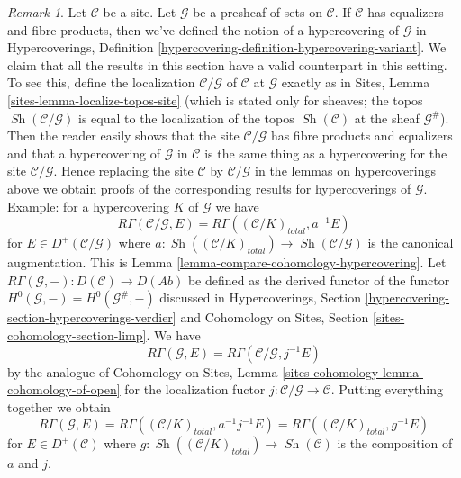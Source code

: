 \documentclass{stacks-project}
\theoremstyle{plain}
\theoremstyle{definition}
\theoremstyle{remark}
\newtheorem{remark}[subsection]{Remark}
\numberwithin{equation}{subsection}
\def\Sh{\mathop{\mathit{Sh}}\nolimits}
\begin{document}
\begin{remark}
\label{remark-compare-cohomology-hypercovering-presheaf}
Let $\mathcal{C}$ be a site. Let $\mathcal{G}$ be a presheaf of sets on
$\mathcal{C}$. If $\mathcal{C}$ has equalizers and fibre products, then
we've defined the notion of a hypercovering of $\mathcal{G}$ in
Hypercoverings, Definition \ref{hypercovering-definition-hypercovering-variant}.
We claim that all the results in this section have a
valid counterpart in this setting.
To see this,
define the localization $\mathcal{C}/\mathcal{G}$
of $\mathcal{C}$ at $\mathcal{G}$ exactly as in
Sites, Lemma \ref{sites-lemma-localize-topos-site}
(which is stated only for sheaves; the topos
$\Sh(\mathcal{C}/\mathcal{G})$ is equal to the localization
of the topos $\Sh(\mathcal{C})$ at the sheaf $\mathcal{G}^\#$).
Then the reader easily shows that the site
$\mathcal{C}/\mathcal{G}$ has fibre products and equalizers
and that a hypercovering of $\mathcal{G}$ in $\mathcal{C}$
is the same thing as a hypercovering for the site $\mathcal{C}/\mathcal{G}$.
Hence replacing the site $\mathcal{C}$ by $\mathcal{C}/\mathcal{G}$
in the lemmas on hypercoverings above we obtain proofs of the
corresponding results for hypercoverings of $\mathcal{G}$.
Example: for a hypercovering $K$ of $\mathcal{G}$ we have
$$
R\Gamma(\mathcal{C}/\mathcal{G}, E) =
R\Gamma((\mathcal{C}/K)_{total}, a^{-1}E)
$$
for $E \in D^+(\mathcal{C}/\mathcal{G})$ where
$a : \Sh((\mathcal{C}/K)_{total}) \to \Sh(\mathcal{C}/\mathcal{G})$
is the canonical augmentation. This is
Lemma \ref{lemma-compare-cohomology-hypercovering}.
Let $R\Gamma(\mathcal{G}, -) : D(\mathcal{C}) \to D(\textit{Ab})$
be defined as the derived functor of the functor
$H^0(\mathcal{G}, -) = H^0(\mathcal{G}^\#, -)$
discussed in Hypercoverings, Section
\ref{hypercovering-section-hypercoverings-verdier} and
Cohomology on Sites, Section \ref{sites-cohomology-section-limp}.
We have
$$
R\Gamma(\mathcal{G}, E) = R\Gamma(\mathcal{C}/\mathcal{G}, j^{-1}E)
$$
by the analogue of Cohomology on Sites, Lemma
\ref{sites-cohomology-lemma-cohomology-of-open}
for the localization fuctor $j : \mathcal{C}/\mathcal{G} \to \mathcal{C}$.
Putting everything together we obtain
$$
R\Gamma(\mathcal{G}, E) =
R\Gamma((\mathcal{C}/K)_{total}, a^{-1}j^{-1}E) =
R\Gamma((\mathcal{C}/K)_{total}, g^{-1}E)
$$
for $E \in D^+(\mathcal{C})$ where
$g : \Sh((\mathcal{C}/K)_{total}) \to \Sh(\mathcal{C})$
is the composition of $a$ and $j$.
\end{remark}
\end{document}

